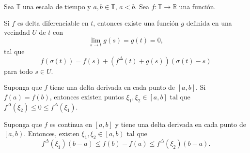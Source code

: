 \begin{frame}
	
	Sea $\mathds{T}$ una escala de tiempo y $a,b\in\mathds{T}$, $a<b$. Sea $f\colon\mathds{T}\rightarrow\mathds{R}$ una función.
	\begin{theorem}
		Si $f$ es delta diferenciable en $t$, entonces existe una función $g$ definida en una vecindad $U$ de $t$ con \[ \lim\limits_{s\to t}g\left(s\right)=g\left(t\right)=0, \] tal que \[ f\left(\sigma\left(t\right)\right)=f\left(s\right)+\left(f^{\Delta}\left(t\right)+g\left(s\right)\right)\left(\sigma\left(t\right)-s\right) \] para todo $s\in U$.
	\end{theorem}

	\begin{theorem}
		Suponga que $f$ tiene una delta derivada en cada punto de $\left[a,b\right]$. Si $f\left(a\right)=f\left(b\right)$, entonces existen puntos $\xi_{1},\xi_{2}\in\left[a,b\right]$ tal que $f^{\Delta}\left(\xi_{2}\right)\leq 0\leq f^{\Delta}\left(\xi_{1}\right)$.
	\end{theorem}

	\begin{theorem}
		Suponga que $f$ es continua en $\left[a,b\right]$ y tiene una delta derivada en cada punto de $\left[a,b\right)$. Entonces, existen $\xi_{1},\xi_{2}\in\left[a,b\right)$ tal que \[ f^{\Delta}\left(\xi_{1}\right)\left(b-a\right)\leq f\left(b\right)-f\left(a\right)\leq f^{\Delta}\left(\xi_{2}\right)\left(b-a\right). \]
	\end{theorem}

\end{frame}

